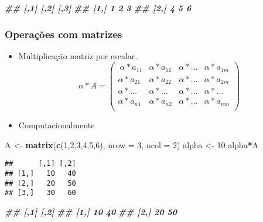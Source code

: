 \documentclass[
]{article}
\newenvironment{Shaded}{\begin{snugshade}}{\end{snugshade}}
\newcommand{\AttributeTok}[1]{\textcolor[rgb]{0.13,0.29,0.53}{#1}}
\newcommand{\DecValTok}[1]{\textcolor[rgb]{0.00,0.00,0.81}{#1}}
\newcommand{\DocumentationTok}[1]{\textcolor[rgb]{0.56,0.35,0.01}{\textbf{\textit{#1}}}}
\newcommand{\FunctionTok}[1]{\textcolor[rgb]{0.13,0.29,0.53}{\textbf{#1}}}
\newcommand{\NormalTok}[1]{#1}
\newcommand{\OtherTok}[1]{\textcolor[rgb]{0.56,0.35,0.01}{#1}}
\newcommand{\SpecialCharTok}[1]{\textcolor[rgb]{0.81,0.36,0.00}{\textbf{#1}}}
\begin{document}
\begin{Shaded}
\begin{Highlighting}[]
\DocumentationTok{\#\# [,1] [,2] [,3]}
\DocumentationTok{\#\# [1,] 1 2 3}
\DocumentationTok{\#\# [2,] 4 5 6}
\end{Highlighting}
\end{Shaded}

\hypertarget{operauxe7uxf5es-com-matrizes}{%
\subsubsection{Operações com
matrizes}\label{operauxe7uxf5es-com-matrizes}}

\begin{itemize}
\item
  Multiplicação matriz por escalar. \[\alpha * A = \begin{pmatrix}\
  \alpha * a_{11} & \alpha * a_{12} & \alpha * ... & \alpha * a_{1m}\\
  \alpha * a_{21} & \alpha * a_{22} & \alpha * ... & \alpha * a_{2m}\\
  \alpha * ... & \alpha * ... & \alpha * ... & \alpha * ... \\
  \alpha * a_{n1} & \alpha * a_{n2} & \alpha * ... & \alpha * a_{nm}\\
  \end{pmatrix}\]
\item
  Computacionalmente
\end{itemize}

\begin{Shaded}
\begin{Highlighting}[]
\NormalTok{A }\OtherTok{\textless{}{-}} \FunctionTok{matrix}\NormalTok{(}\FunctionTok{c}\NormalTok{(}\DecValTok{1}\NormalTok{,}\DecValTok{2}\NormalTok{,}\DecValTok{3}\NormalTok{,}\DecValTok{4}\NormalTok{,}\DecValTok{5}\NormalTok{,}\DecValTok{6}\NormalTok{),}
\AttributeTok{nrow =} \DecValTok{3}\NormalTok{, }\AttributeTok{ncol =} \DecValTok{2}\NormalTok{)}
\NormalTok{alpha }\OtherTok{\textless{}{-}} \DecValTok{10}
\NormalTok{alpha}\SpecialCharTok{*}\NormalTok{A}
\end{Highlighting}
\end{Shaded}

\begin{verbatim}
##      [,1] [,2]
## [1,]   10   40
## [2,]   20   50
## [3,]   30   60
\end{verbatim}

\begin{Shaded}
\begin{Highlighting}[]
\DocumentationTok{\#\# [,1] [,2]}
\DocumentationTok{\#\# [1,] 10 40}
\DocumentationTok{\#\# [2,] 20 50}
\end{Highlighting}
\end{Shaded}
\end{document}
